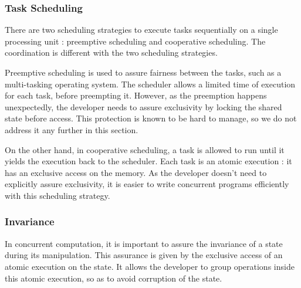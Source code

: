 \subsubsection{Task Scheduling}

There are two scheduling strategies to execute tasks sequentially on a single processing unit : preemptive scheduling and cooperative scheduling.
The coordination is different with the two scheduling strategies.


Preemptive scheduling is used to assure fairness between the tasks, such as a multi-tasking operating system.
The scheduler allows a limited time of execution for each task, before preempting it.
However, as the preemption happens unexpectedly, the developer needs to assure exclusivity by locking the shared state before access.
This protection is known to be hard to manage, so we do not address it any further in this section.

On the other hand, in cooperative scheduling, a task is allowed to run until it yields the execution back to the scheduler.
Each task is an atomic execution : it has an exclusive access on the memory.
As the developer doesn't need to explicitly assure exclusivity, it is easier to write concurrent programs efficiently with this scheduling strategy.

\subsubsection{Invariance}

In concurrent computation, it is important to assure the invariance of a state during its manipulation.
This assurance is given by the exclusive access of an atomic execution on the state.
It allows the developer to group operations inside this atomic execution, so as to avoid corruption of the state.

